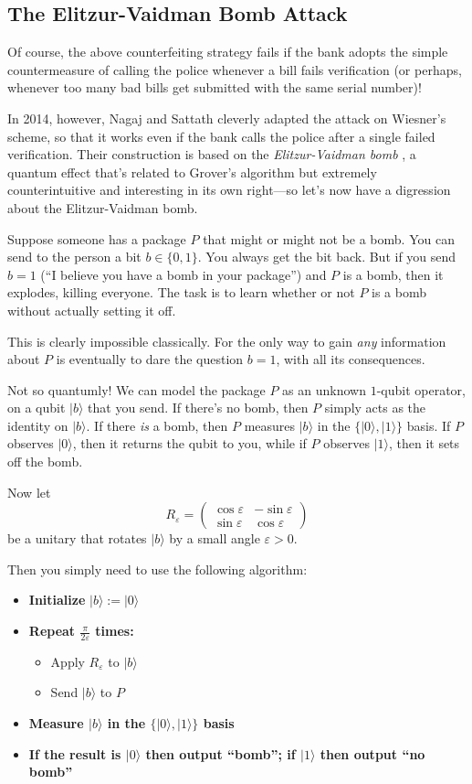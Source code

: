 \documentclass[12pt]{report}
\theoremstyle{plain}
\theoremstyle{definition}
\newcommand{\eps}{\varepsilon}
\renewcommand{\ket}[1]{|#1\rangle}
\begin{document}
\subsection{The Elitzur-Vaidman Bomb Attack}

Of course, the above counterfeiting strategy fails if the bank adopts the simple countermeasure of calling the police whenever a bill fails verification (or perhaps, whenever too many bad bills get submitted with the same serial number)!

In 2014, however, Nagaj and Sattath \cite{NS14} cleverly adapted the attack on Wiesner's scheme, so that it works even if the bank calls the police after a single failed verification.  Their construction is based on the {\em Elitzur-Vaidman bomb} \cite{EV93}, a quantum effect that's related to Grover's algorithm but extremely counterintuitive and interesting in its own right---so let's now have a digression about the Elitzur-Vaidman bomb.

Suppose someone has a package $P$ that might or might not be a bomb. You can send to the person a bit $b\in\{0,1\}$. You always get the bit back. But if you send $b=1$ (``I believe you have a bomb in your package'') and $P$ is a bomb, then it explodes, killing everyone. The task is to learn whether or not $P$ is a bomb without actually setting it off.

This is clearly impossible classically.  For the only way to gain {\em any} information about $P$ is eventually to dare the question $b=1$, with all its consequences.

Not so quantumly!  We can model the package $P$ as an unknown $1$-qubit operator, on a qubit $\ket{b}$ that you send.  If there's no bomb, then $P$ simply acts as the identity on $\ket{b}$.  If there {\em is} a bomb, then $P$ measures $\ket{b}$ in the $\{\ket{0},\ket{1} \}$ basis.  If $P$ observes $\ket{0}$, then it returns the qubit to you, while if $P$ observes $\ket{1}$, then it sets off the bomb.

Now let
$$
R_\eps = \begin{pmatrix}\cos\eps & -\sin\eps\\ \sin\eps & \cos\eps\end{pmatrix}
$$
be a unitary that rotates $\ket{b}$ by a small angle $\eps > 0$.

Then you simply need to use the following algorithm:

\begin{itemize}
\item \textbf{Initialize} $\ket{b} := \ket{0}$
\item \textbf{Repeat $\frac{\pi}{2 \eps}$ times:}
\begin{itemize}
\item Apply $R_\eps$ to $\ket{b}$
\item Send $\ket{b}$ to $P$
\end{itemize}
\item \textbf{Measure $\ket{b}$ in the $\{\ket{0},\ket{1} \}$ basis}
\item \textbf{If the result is $\ket{0}$ then output ``bomb''; if $\ket{1}$ then output ``no bomb''}
\end{itemize}
\end{document}
